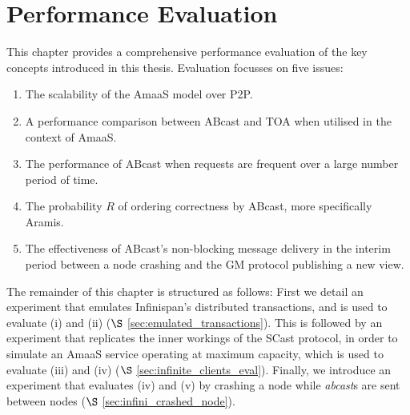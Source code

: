 \chapter{Performance Evaluation}\label{ch:perf_eval}
    \graphicspath{{Chapter6-PerformanceEvaluation/Figs/Vector/}{Chapter6-PerformanceEvaluation/Figs/}}
    
    This chapter provides a comprehensive performance evaluation of the key concepts introduced in this thesis.  Evaluation focusses on five issues: 
    \begin{enumerate}[label=\roman*]
    \item    The scalability of the \textsf{AmaaS} model over P2P.  
    
    \item    A performance comparison between \textsf{ABcast} and TOA when utilised in the context of \textsf{AmaaS}.
    
    \item    The performance of \textsf{ABcast} when requests are frequent over a large number period of time.  
    
    \item    The probability $R$ of ordering correctness by \textsf{ABcast}, more specifically \textsf{Aramis}.
    
    \item    The effectiveness of \textsf{ABcast}'s non-blocking message delivery in the interim period between a node crashing and the GM protocol publishing a new view.  
    \end{enumerate}    

   
    The remainder of this chapter is structured as follows: First we detail an experiment that emulates Infinispan's distributed transactions, and is used to evaluate (i) and (ii) ($\S$ \ref{sec:emulated_transactions}).  This is followed by an experiment that replicates the inner workings of the \textsf{SCast} protocol, in order to simulate an \textsf{AmaaS} service operating at maximum capacity, which is used to evaluate (iii) and (iv) ($\S$ \ref{sec:infinite_clients_eval}).  Finally, we introduce an experiment that evaluates (iv) and (v) by crashing a node while \emph{abcast}s are sent between nodes ($\S$ \ref{sec:infini_crashed_node}).  


